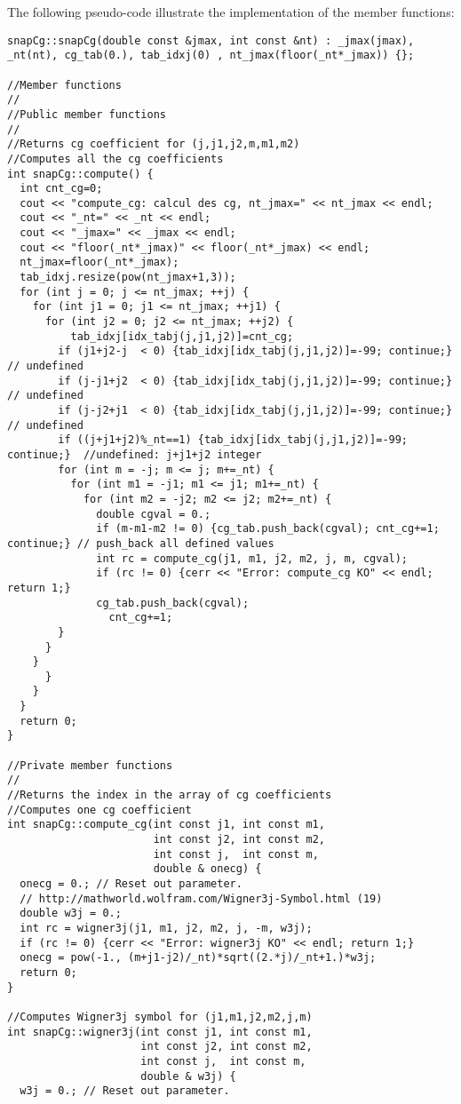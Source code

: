 \documentclass[12pt]{article}
\begin{document}
        The following pseudo-code illustrate the implementation of the member functions:
        \begin{lstlisting}
snapCg::snapCg(double const &jmax, int const &nt) : _jmax(jmax), _nt(nt), cg_tab(0.), tab_idxj(0) , nt_jmax(floor(_nt*_jmax)) {}; 

//Member functions
//
//Public member functions 
//
//Returns cg coefficient for (j,j1,j2,m,m1,m2)
//Computes all the cg coefficients
int snapCg::compute() {
  int cnt_cg=0;
  cout << "compute_cg: calcul des cg, nt_jmax=" << nt_jmax << endl;
  cout << "_nt=" << _nt << endl;
  cout << "_jmax=" << _jmax << endl;
  cout << "floor(_nt*_jmax)" << floor(_nt*_jmax) << endl;
  nt_jmax=floor(_nt*_jmax);
  tab_idxj.resize(pow(nt_jmax+1,3));
  for (int j = 0; j <= nt_jmax; ++j) {
    for (int j1 = 0; j1 <= nt_jmax; ++j1) {
      for (int j2 = 0; j2 <= nt_jmax; ++j2) {
	      tab_idxj[idx_tabj(j,j1,j2)]=cnt_cg;
        if (j1+j2-j  < 0) {tab_idxj[idx_tabj(j,j1,j2)]=-99; continue;} // undefined
        if (j-j1+j2  < 0) {tab_idxj[idx_tabj(j,j1,j2)]=-99; continue;} // undefined
        if (j-j2+j1  < 0) {tab_idxj[idx_tabj(j,j1,j2)]=-99; continue;} // undefined
        if ((j+j1+j2)%_nt==1) {tab_idxj[idx_tabj(j,j1,j2)]=-99; continue;}  //undefined: j+j1+j2 integer
        for (int m = -j; m <= j; m+=_nt) {
          for (int m1 = -j1; m1 <= j1; m1+=_nt) {
            for (int m2 = -j2; m2 <= j2; m2+=_nt) {
              double cgval = 0.;
              if (m-m1-m2 != 0) {cg_tab.push_back(cgval); cnt_cg+=1; continue;} // push_back all defined values
              int rc = compute_cg(j1, m1, j2, m2, j, m, cgval);
              if (rc != 0) {cerr << "Error: compute_cg KO" << endl; return 1;}
              cg_tab.push_back(cgval);
	            cnt_cg+=1;
  	    }
	  }
	}
      }
    }
  }
  return 0;
}

//Private member functions
//
//Returns the index in the array of cg coefficients
//Computes one cg coefficient
int snapCg::compute_cg(int const j1, int const m1,
                       int const j2, int const m2,
                       int const j,  int const m,
                       double & onecg) {
  onecg = 0.; // Reset out parameter.
  // http://mathworld.wolfram.com/Wigner3j-Symbol.html (19)
  double w3j = 0.;
  int rc = wigner3j(j1, m1, j2, m2, j, -m, w3j);
  if (rc != 0) {cerr << "Error: wigner3j KO" << endl; return 1;}
  onecg = pow(-1., (m+j1-j2)/_nt)*sqrt((2.*j)/_nt+1.)*w3j;
  return 0;
}

//Computes Wigner3j symbol for (j1,m1,j2,m2,j,m)
int snapCg::wigner3j(int const j1, int const m1,
                     int const j2, int const m2,
                     int const j,  int const m,
                     double & w3j) {
  w3j = 0.; // Reset out parameter.


\end{lstlisting}
\end{document}
